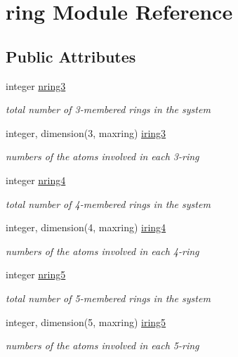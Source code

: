 \hypertarget{classring}{\section{ring Module Reference}
\label{classring}
}
\subsection*{Public Attributes}
\begin{DoxyCompactItemize}
\item 
integer \hyperlink{classring_a7245188aa815fe6def787091f64f6340}{nring3}
\begin{DoxyCompactList}\small\item\em total number of 3-\/membered rings in the system \end{DoxyCompactList}\item 
integer, dimension(3, maxring) \hyperlink{classring_a3bc564cc968daf49c6dad75eebd480c8}{iring3}
\begin{DoxyCompactList}\small\item\em numbers of the atoms involved in each 3-\/ring \end{DoxyCompactList}\item 
integer \hyperlink{classring_a1e9dde7721a62bc71ba89c0f2a05ce17}{nring4}
\begin{DoxyCompactList}\small\item\em total number of 4-\/membered rings in the system \end{DoxyCompactList}\item 
integer, dimension(4, maxring) \hyperlink{classring_ac49f3aa846c6203d5da4f56249225200}{iring4}
\begin{DoxyCompactList}\small\item\em numbers of the atoms involved in each 4-\/ring \end{DoxyCompactList}\item 
integer \hyperlink{classring_a5213f15f702844db955daefe99e2602d}{nring5}
\begin{DoxyCompactList}\small\item\em total number of 5-\/membered rings in the system \end{DoxyCompactList}\item 
integer, dimension(5, maxring) \hyperlink{classring_a7324a91fac3f235d56c25c2c6fb6cfbf}{iring5}
\begin{DoxyCompactList}\small\item\em numbers of the atoms involved in each 5-\/ring \end{DoxyCompactList}\item 

\end{DoxyCompactItemize}
